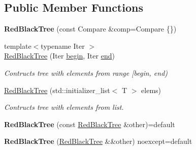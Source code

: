 \subsection*{Public Member Functions}
\begin{DoxyCompactItemize}
\item 
\mbox{\label{classlab_1_1forest_1_1RedBlackTree_a50e09d93668a4ad79e2cb90e43fc8136}} 
{\bfseries Red\+Black\+Tree} (const Compare \&comp=Compare \{\})
\item 
\mbox{\label{classlab_1_1forest_1_1RedBlackTree_aa067218aae3ec9bdd1be4ece7d6c4ff7}} 
{\footnotesize template$<$typename Iter $>$ }\\\hyperlink{classlab_1_1forest_1_1RedBlackTree_aa067218aae3ec9bdd1be4ece7d6c4ff7}{Red\+Black\+Tree} (Iter \hyperlink{classlab_1_1forest_1_1detail_1_1BSTBase_aee57d4461130971ad187ea41bc8e4e74}{begin}, Iter \hyperlink{classlab_1_1forest_1_1detail_1_1BSTBase_ad2ea364cc61d5581a861d1aab3734129}{end})
\begin{DoxyCompactList}\small\item\em Contructs tree with elements from range \mbox{[}begin, end) \end{DoxyCompactList}\item 
\mbox{\label{classlab_1_1forest_1_1RedBlackTree_ac1098111d7495f6640b531344496456b}} 
\hyperlink{classlab_1_1forest_1_1RedBlackTree_ac1098111d7495f6640b531344496456b}{Red\+Black\+Tree} (std\+::initializer\+\_\+list$<$ T $>$ elems)
\begin{DoxyCompactList}\small\item\em Contructs tree with elements from list. \end{DoxyCompactList}\item 
\mbox{\label{classlab_1_1forest_1_1RedBlackTree_a80a7256b0b3f65d1592d653754d780c0}} 
{\bfseries Red\+Black\+Tree} (const \hyperlink{classlab_1_1forest_1_1RedBlackTree}{Red\+Black\+Tree} \&other)=default
\item 
\mbox{\label{classlab_1_1forest_1_1RedBlackTree_a4b53ce03c8b61782fcd49e372cbd8b85}} 
{\bfseries Red\+Black\+Tree} (\hyperlink{classlab_1_1forest_1_1RedBlackTree}{Red\+Black\+Tree} \&\&other) noexcept=default

\end{DoxyCompactItemize}
